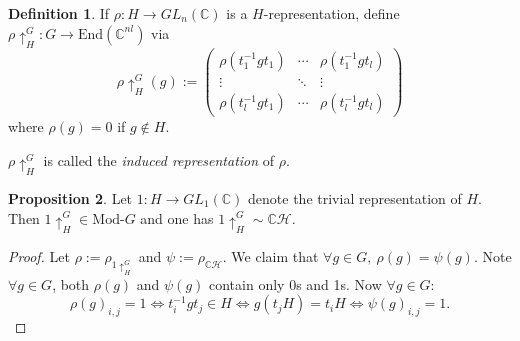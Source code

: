 \documentclass{article}
\newcommand{\cH}{\mathcal{H}}
\newcommand{\C}{\mathbb{C}}
\newcommand{\End}{\text{End}}
\newcommand{\Mod}{\text{Mod-}}
\theoremstyle{definition}
\newtheorem{defn}{Definition}[subsection]
\newtheorem{prop}[defn]{Proposition}
\begin{document}
\begin{defn}
If $\rho:H\rightarrow GL_n(\C)$ is a $H$-representation, define $\rho\uparrow_H^G:G\rightarrow \End(\C^{nl})$ via
\[
\rho\uparrow_H^G(g):=\begin{pmatrix}
\rho(t_1^{-1}gt_1) & \cdots & \rho(t_1^{-1}gt_l) \\
\vdots & \ddots & \vdots \\
\rho(t_l^{-1}gt_1) & \cdots & \rho(t_l^{-1}gt_l)
\end{pmatrix}
\]
where $\rho(g)=0$ if $g\notin H$.

$\rho\uparrow_H^G$ is called the \textit{induced representation} of $\rho$.
\end{defn}

\begin{prop}
\label{prop:trivinduced}
Let $1:H\rightarrow GL_1(\C)$ denote the trivial representation of $H$. Then $1\uparrow_H^G\in\Mod G$ and one has $1\uparrow_H^G\sim\C\cH$.
\end{prop}
\begin{proof}
Let $\rho:=\rho_{1\uparrow_H^G}$ and $\psi:=\rho_{\C\cH}$. We claim that $\forall g\in G,\ \rho(g)=\psi(g)$. Note $\forall g\in G$, both $\rho(g)$ and $\psi(g)$ contain only 0s and 1s. Now $\forall g\in G$:
\[
\rho(g)_{i,j}=1\iff t_i^{-1}gt_j\in H\iff g(t_jH)=t_iH\iff \psi(g)_{i,j}=1.
\]
\end{proof}
\end{document}
